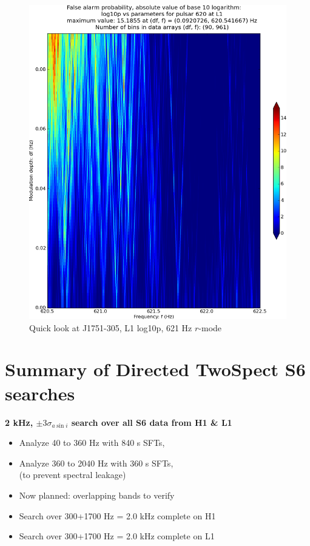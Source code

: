 \begin{figure}
\begin{center}
\includegraphics[width=0.4\paperwidth,height=0.2\paperheight]{plots/DFvsFresultsProb-L1_pulsar-620.eps}
\caption{
Quick look at J1751-305, L1 log10p, 621 Hz $r$-mode}
\end{center}
\end{figure}


\section{Summary of Directed TwoSpect S6 searches}

\textbf{2 kHz, $\pm 3 \sigma_{a \sin i}$ search over all S6 data from H1 \& L1}
\begin{itemize}
\item Analyze 40 to 360 Hz with 840 s SFTs,
\item Analyze 360 to 2040 Hz with 360 s SFTs,\\
(to prevent spectral leakage)
\item Now planned: overlapping bands to verify
\item Search over 300+1700 Hz = 2.0 kHz complete on H1
\item Search over 300+1700 Hz = 2.0 kHz complete on L1
\end{itemize}


